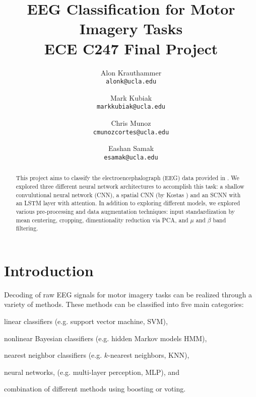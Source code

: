 \documentclass[10pt,twocolumn,letterpaper]{article}
\begin{document}
\title{
    EEG Classification for Motor Imagery Tasks\\
    {\large ECE C247 Final Project}
}

\author{Alon Krauthammer\\
{\tt\small alonk@ucla.edu}
\and
Mark Kubiak\\
{\tt\small markkubiak@ucla.edu}
\and
Chris Munoz\\
{\tt\small cmunozcortes@ucla.edu}
\and
Eashan Samak\\
{\tt\small esamak@ucla.edu}
}

\maketitle

\begin{abstract}
    This project aims to classify the electroencephalograph (EEG) data
    provided in \cite{brunner2008bci}. We explored three different
    neural network architectures to accomplish this task: a shallow 
    convulutional neural network (CNN), a spatial CNN (by 
    Kostas \etal \cite{kostas2019machine}) and an SCNN with an
    LSTM layer with attention. In addition to exploring different models,
    we explored various pre-processing and data augmentation techniques:
    input standardization by mean centering, cropping, dimentionality
    reduction via PCA, and $\mu$ and $\beta$ band filtering.
\end{abstract}

\section{Introduction}
Decoding of raw EEG signals for motor imagery tasks can be realized through a
variety of methods. These methods can be classified into five main categories:
\begin{enumerate*}
    \item linear classifiers (e.g. support vector machine, SVM),
    \item nonlinear Bayesian classifiers (e.g. hidden Markov models HMM),
    \item nearest neighbor classifiers (e.g. $k$-nearest neighbors, KNN),
    \item neural networks, (e.g. multi-layer perception, MLP), and
    \item combination of different methods using boosting or voting.
\end{enumerate*} \cite{wang}
\end{document}

